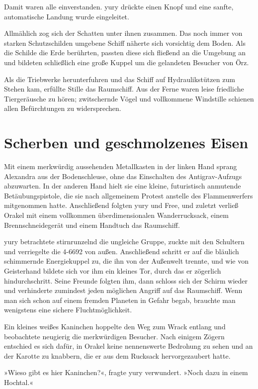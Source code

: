 Damit waren alle einverstanden. yury drückte einen Knopf und eine sanfte, automatische Landung wurde eingeleitet.

Allmählich zog sich der Schatten unter ihnen zusammen. Das noch immer von starken Schutzschilden umgebene Schiff näherte sich vorsichtig dem Boden. Als die Schilde die Erde berührten, passten diese sich fließend an die Umgebung an und bildeten schließlich eine große Kuppel um die gelandeten Besucher von Örz.

Als die Triebwerke herunterfuhren und das Schiff auf Hydraulikstützen zum Stehen kam, erfüllte Stille das Raumschiff. Aus der Ferne waren leise friedliche Tiergeräusche zu hören; zwitschernde Vögel und vollkommene Windstille schienen allen Befürchtungen zu widersprechen.


\chapter{Scherben und geschmolzenes Eisen}

Mit einem merkwürdig aussehenden Metallkasten in der linken Hand sprang Alexandra aus der Bodenschleuse, ohne das Einschalten des Antigrav-Aufzugs abzuwarten. In der anderen Hand hielt sie eine kleine, futuristisch anmutende Betäubungspistole, die sie nach allgemeinem Protest anstelle des Flammenwerfers mitgenommen hatte. Anschließend folgten yury und Free, und zuletzt verließ Orakel mit einem vollkommen überdimensionalen Wanderrucksack, einem Brennschneidegerät und einem Handtuch das Raumschiff.

yury betrachtete stirnrunzelnd die ungleiche Gruppe, zuckte mit den Schultern und verriegelte die 4-6692 von außen. Anschließend schritt er auf die bläulich schimmernde Energiekuppel zu, die ihn von der Außenwelt trennte, und wie von Geisterhand bildete sich vor ihm ein kleines Tor, durch das er zögerlich hindurchschritt. Seine Freunde folgten ihm, dann schloss sich der Schirm wieder und verhinderte zumindest jeden möglichen Angriff auf das Raumschiff. Wenn man sich schon auf einem fremden Planeten in Gefahr begab, brauchte man wenigstens eine sichere Fluchtmöglichkeit.

Ein kleines weißes Kaninchen hoppelte den Weg zum Wrack entlang und beobachtete neugierig die merkwürdigen Besucher. Nach einigem Zögern entschied es sich dafür, in Orakel keine nennenswerte Bedrohung zu sehen und an der Karotte zu knabbern, die er aus dem Rucksack hervorgezaubert hatte.

»Wieso gibt es hier Kaninchen?«, fragte yury verwundert. »Noch dazu in einem Hochtal.«

